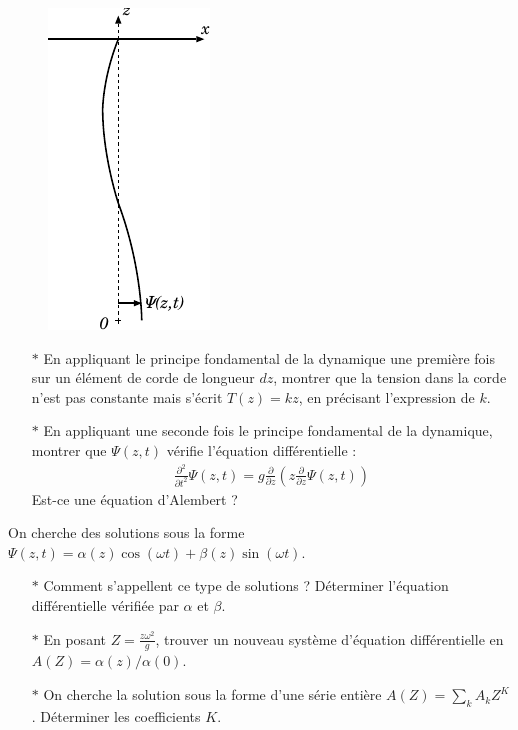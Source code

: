 \documentclass{report}
\begin{document}
\begin{figure}[h!]
\centering
	\includegraphics[scale=1.5]{onde4.pdf}
\end{figure}


\begin{itemize}

	\item[$\ast$] En appliquant le principe fondamental de la dynamique une première fois sur un élément de corde de longueur $dz$, montrer que la tension dans la corde n'est pas constante mais s'écrit $T(z)=kz$, en précisant l'expression de $k$.
	
	\item[$\ast$] En appliquant une seconde fois le principe fondamental de la dynamique, montrer que $\Psi(z,t)$ vérifie l'équation différentielle :
	\begin{align*}
				\frac{\partial^2}{\partial t^2}\Psi(z,t)=g\frac{\partial}{\partial z}\left( z\frac{\partial}{\partial z}\Psi(z,t)\right) 
	\end{align*}
	Est-ce une équation d'Alembert ?

\end{itemize}

On cherche des solutions sous la forme $\Psi(z,t)=\alpha(z)\cos(\omega t)+\beta(z)\sin(\omega t)$. 

\begin{itemize}
	
		\item[$\ast$] Comment s'appellent ce type de solutions ? Déterminer l'équation différentielle vérifiée par $\alpha$ et $\beta$.
		
		\item[$\ast$] En posant $Z=\frac{z\omega^2}{g}$, trouver un nouveau système d'équation différentielle en $A(Z)=\alpha(z)/\alpha(0)$. 
		
		\item[$\ast$] On cherche la solution sous la forme d'une série entière $A(Z)=\sum_k A_k Z^K$. Déterminer les coefficients $K$. 
				
\end{itemize}
\end{document}
